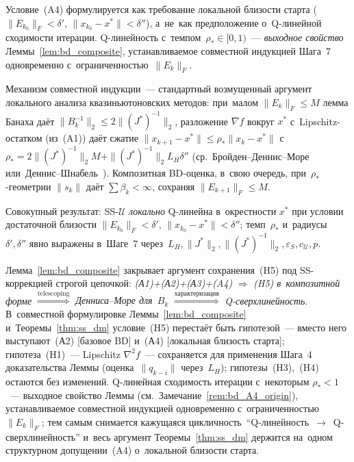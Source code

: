 \begin{remark}\label{rem:bd_A4_origin}
Условие~(A4) формулируется как требование локальной близости старта
($\|E_{k_0}\|_F<\delta'$, $\|x_{k_0}-x^{*}\|<\delta''$), а~не~как предположение
о~Q-линейной сходимости итерации. Q-линейность с~темпом~$\rho_*\in[0,1)$~---
\emph{выходное свойство} Леммы~\ref{lem:bd_composite}, устанавливаемое
совместной индукцией Шага~7 одновременно с~ограниченностью~$\|E_k\|_F$.

Механизм совместной индукции~--- стандартный возмущенный аргумент локального
анализа квазиньютоновских методов: при~малом $\|E_k\|_F\le M$ лемма Банаха
даёт $\|B_k^{-1}\|_2\le 2\|(J^{*})^{-1}\|_2$, разложение $\nabla f$ вокруг $x^{*}$
с~Lipschitz-остатком (из~(A1)) даёт сжатие $\|x_{k+1}-x^{*}\|\le\rho_*\|x_k-x^{*}\|$
с~$\rho_*= 2\|(J^{*})^{-1}\|_2 M + \|(J^{*})^{-1}\|_2 L_H\delta''$
(ср.\ Бройден--Деннис--Море~\cite[Th.~3.1]{broyden1973}
или~Деннис--Шнабель~\cite[Th.~5.4.1]{dennis1996}). Композитная BD-оценка,
в~свою очередь, при~$\rho_*$-геометрии $\|s_k\|$ даёт $\sum\beta_k<\infty$,
сохраняя $\|E_{k+1}\|_F\le M$.

Совокупный результат: SS-$\mathcal{U}$ \emph{локально} Q-линейна в~окрестности
$x^{*}$ при условии достаточной близости $\|E_{k_0}\|_F<\delta'$,
$\|x_{k_0}-x^{*}\|<\delta''$; темп~$\rho_*$ и~радиусы~$\delta',\delta''$ явно
выражены в~Шаге~7 через~$L_H,\|J^{*}\|_2,\|(J^{*})^{-1}\|_2,\varepsilon_S,
c_{\mathcal U},p$.
\end{remark}


\begin{remark}\label{rem:bd_in_thm}
Лемма~\ref{lem:bd_composite} закрывает аргумент сохранения~(H5) под
SS-коррекцией строгой цепочкой:
\emph{(А1)+(А2)+(А3)+(A4)} $\Longrightarrow$ \emph{(H5) в~композитной форме}
$\stackrel{\text{telescoping}}{\Longrightarrow}$ \emph{Денниса--Море для~$B_k$}
$\stackrel{\text{характеризация}}{\Longrightarrow}$ \emph{Q-сверхлинейность}. В~совместной
формулировке Леммы~\ref{lem:bd_composite} и~Теоремы~\ref{thm:ss_dm} условие~(H5)
перестаёт быть гипотезой~--- вместо него выступают~(А2) [базовое BD]
и~(А4) [локальная близость старта]; гипотеза~(H1)~--- Lipschitz $\nabla^2 f$~---
сохраняется для применения Шага~4 доказательства Леммы (оценка~$\|q_{k-i}\|$
через~$L_H$); гипотезы~(H3),~(H4) остаются без изменений. Q-линейная сходимость
итерации с~некоторым $\rho_*<1$~--- выходное свойство Леммы (см.~Замечание~\ref{rem:bd_A4_origin}),
устанавливаемое совместной индукцией одновременно с~ограниченностью~$\|E_k\|_F$;
тем самым снимается кажущаяся цикличность~``Q-линейность~$\to$~Q-сверхлинейность''
и~весь аргумент Теоремы~\ref{thm:ss_dm} держится на~одном структурном допущении~(A4)
о~локальной близости старта.
\end{remark}


